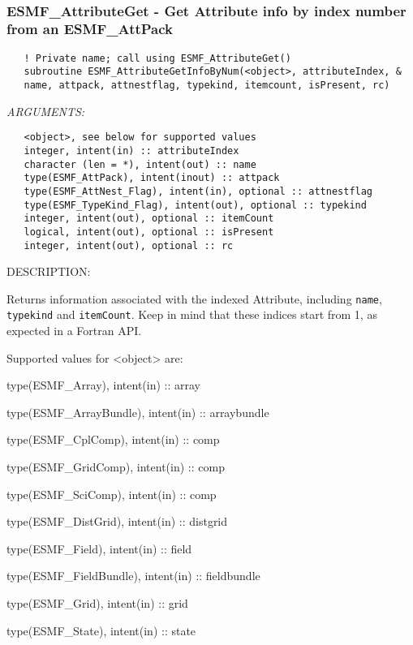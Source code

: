    
 
\mbox{}\hrulefill\ 
 
\subsubsection [ESMF\_AttributeGet] {ESMF\_AttributeGet - Get Attribute info by index number from an ESMF\_AttPack}


  
\begin{verbatim}   ! Private name; call using ESMF_AttributeGet()
   subroutine ESMF_AttributeGetInfoByNum(<object>, attributeIndex, &
   name, attpack, attnestflag, typekind, itemcount, isPresent, rc)\end{verbatim}{\em ARGUMENTS:}
\begin{verbatim}   <object>, see below for supported values
   integer, intent(in) :: attributeIndex
   character (len = *), intent(out) :: name
   type(ESMF_AttPack), intent(inout) :: attpack
   type(ESMF_AttNest_Flag), intent(in), optional :: attnestflag
   type(ESMF_TypeKind_Flag), intent(out), optional :: typekind
   integer, intent(out), optional :: itemCount
   logical, intent(out), optional :: isPresent
   integer, intent(out), optional :: rc\end{verbatim}
{\sf DESCRIPTION:\\ }


   Returns information associated with the indexed Attribute,
   including {\tt name}, {\tt typekind} and {\tt itemCount}. Keep in
   mind that these indices start from 1, as expected in a Fortran API.
  
   Supported values for <object> are:
   \begin{description}
   \item type(ESMF\_Array), intent(in) :: array
   \item type(ESMF\_ArrayBundle), intent(in) :: arraybundle
   \item type(ESMF\_CplComp), intent(in) :: comp
   \item type(ESMF\_GridComp), intent(in) :: comp
   \item type(ESMF\_SciComp), intent(in) :: comp
   \item type(ESMF\_DistGrid), intent(in) :: distgrid
   \item type(ESMF\_Field), intent(in) :: field
   \item type(ESMF\_FieldBundle), intent(in) :: fieldbundle
   \item type(ESMF\_Grid), intent(in) :: grid
   \item type(ESMF\_State), intent(in) :: state
   \end{description}
  
